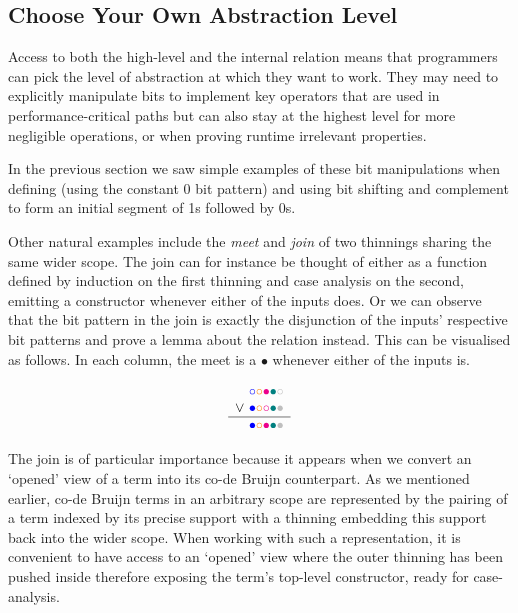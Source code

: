 \subsection{Choose Your Own Abstraction Level}

Access to both the high-level  and the internal 
relation means that programmers can pick the level of abstraction at which they
want to work.
%
They may need to explicitly manipulate bits to implement key operators that are
used in performance-critical paths but can also stay at the highest level for
more negligible operations, or when proving runtime irrelevant properties.

In the previous section we saw simple examples of these bit manipulations when
defining  (using the constant 0 bit pattern) and
 using bit shifting and complement to form an initial segment
of 1s followed by 0s.

Other natural examples include the \emph{meet} and \emph{join} of two thinnings
sharing the same wider scope.
%
The join can for instance be thought of either as a function defined by induction
on the first thinning and case analysis on the second, emitting a 
constructor whenever either of the inputs does.
%
Or we can observe that the bit pattern in the join is exactly the disjunction of
the inputs' respective bit patterns and prove a lemma about the 
relation instead.
%
This can be visualised as follows. In each column, the meet is a
$\bullet$ whenever either of the inputs is.

\[
\begin{array}{c@{~}l}
& \color{blue}{\circ}\color{orange}{\circ}\color{magenta}{\bullet}\color{teal}{\bullet}\color{lightgray}{\circ} \\
  \vee & \color{blue}{\bullet}\color{orange}{\circ}\color{magenta}{\circ}\color{teal}{\bullet}\color{lightgray}{\bullet} \\
  \hline
  & \color{blue}{\bullet}\color{orange}{\circ}\color{magenta}{\bullet}\color{teal}{\bullet}\color{lightgray}{\bullet} \\
\end{array}
\]

The join is of particular importance because it appears when we convert an `opened'
view of a term into its co-de Bruijn counterpart.
%
As we mentioned earlier, co-de Bruijn terms in an arbitrary scope are represented by
the pairing of a term indexed by its precise support with a thinning embedding this
support back into the wider scope.
%
When working with such a representation, it is convenient to have access to an
`opened' view where the outer thinning has been pushed inside therefore exposing
the term's top-level constructor, ready for case-analysis.


